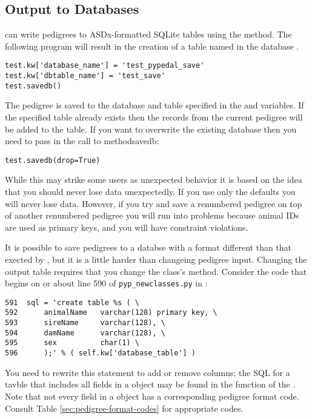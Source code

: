 \subsection{Output to Databases}\label{sec:io-output-database}
\PyPedal{} can write  pedigrees to ASDx-formatted SQLite tables using the  method. The following program will result in the creation of a table named  in the database .
\begin{verbatim}
test.kw['database_name'] = 'test_pypedal_save'
test.kw['dbtable_name'] = 'test_save'
test.savedb()
\end{verbatim}
The pedigree is saved to the database and table specified in the  and  variables. If the specified table already exists then the records from the current pedigree will be added to the table. If you want to overwrite the existing database then you need to pass  in the call to method{savedb}:
\begin{verbatim}
test.savedb(drop=True)
\end{verbatim}
While this may strike some users as unexpected behavior it is based on the idea that you should never lose data unexpectedly. If you use only the defaults you will never lose data. However, if you try and save a renumbered pedigree on top of another renumbered pedigree you will run into problems because animal IDs are used as primary keys, and you will have constraint violations.

It is possible to save pedigrees to a databse
with a format different than that exected by \PyPedal{}, but it is a little harder than
changeing pedigree input. Changing the output table requires that you change the
 class's  method. Consider the code that begins on or
about line 590 of \texttt{pyp_newclasses.py} in :
\begin{verbatim}
591  sql = 'create table %s ( \
592      animalName   varchar(128) primary key, \
593      sireName     varchar(128), \
594      damName      varchar(128), \
595      sex          char(1) \
596      );' % ( self.kw['database_table'] )
\end{verbatim}
You need to rewrite this statement to add or remove columns; the SQL for a tavble that 
includes all fields in a  object may be found in the 
\function{createPedigreeTable} function of the . Note that not 
every field in a  object has a corresponding pedigree format code. 
Consult Table \ref{sec:pedigree-format-codes} for appropriate codes.

